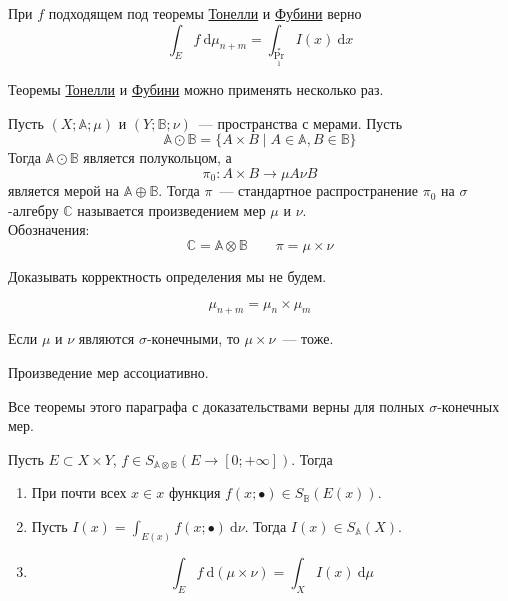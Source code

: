 \documentclass{article}
\begin{document}
    \begin{property}
        При $f$ подходящем под теоремы \hyperref[Теорема Тонелли]{Тонелли} и \hyperref[Теорема Фубини]{Фубини} верно
        $$
        \int_E f~\mathrm d\mu_{n+m}=\int_{\Pr^*_1}I(x)~\mathrm dx
        $$
    \end{property}
    \begin{remark}
        Теоремы \hyperref[Теорема Тонелли]{Тонелли} и \hyperref[Теорема Фубини]{Фубини} можно применять несколько раз.
    \end{remark}
    \begin{definition}
        Пусть $(X;\mathbb A;\mu)$ и $(Y;\mathbb B;\nu)$~--- пространства с мерами. Пусть
        $$
        \mathbb A\odot\mathbb B=\{A\times B\mid A\in\mathbb A,B\in\mathbb B\}
        $$
        Тогда $\mathbb A\odot\mathbb B$ является полукольцом, а
        $$
        \pi_0\colon A\times B\to\mu A\nu B
        $$
        является мерой на $\mathbb A\oplus\mathbb B$. Тогда $\pi$~--- стандартное распространение $\pi_0$ на $\sigma$-алгебру $\mathbb C$ называется произведением мер $\mu$ и $\nu$.\\
        Обозначения:
        $$
        \mathbb C=\mathbb A\otimes\mathbb B\qquad \pi=\mu\times\nu
        $$
    \end{definition}
    \begin{remark}
        Доказывать корректность определения мы не будем.
    \end{remark}
    \begin{property}
        $$
        \mu_{n+m}=\mu_n\times\mu_m
        $$
    \end{property}
    \begin{property}
        Если $\mu$ и $\nu$ являются $\sigma$-конечными, то $\mu\times\nu$~--- тоже.
    \end{property}
    \begin{property}
        Произведение мер ассоциативно.
    \end{property}
    \begin{property}
        Все теоремы этого параграфа с доказательствами верны для полных $\sigma$-конечных мер.
    \end{property}
    \begin{theorem}
        Пусть $E\subset X\times Y$, $f\in S_{\mathbb A\otimes\mathbb B}(E\to[0;+\infty])$. Тогда
        \begin{enumerate}
            \item При почти всех $x\in x$ функция $f(x;\bullet)\in S_{\mathbb B}(E(x))$.
            \item Пусть $I(x)=\int_{E(x)}f(x;\bullet)~\mathrm d\nu$. Тогда $I(x)\in S_{\mathbb A}(X)$.
            \item
            $$\int_E f~\mathrm d(\mu\times\nu)=\int_{X}I(x)~\mathrm d\mu$$
        \end{enumerate}
    \end{theorem}
\end{document}

